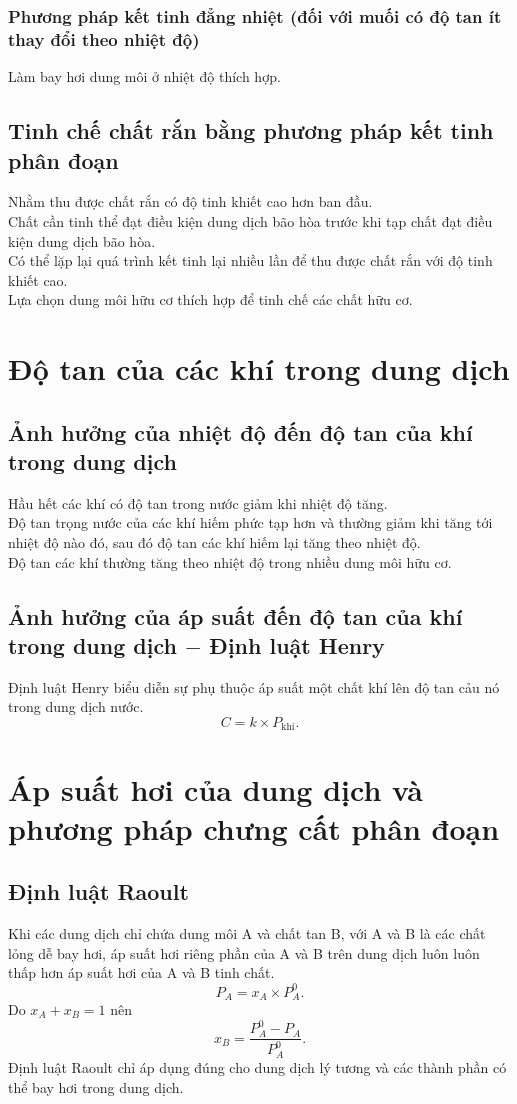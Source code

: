 \subsubsection{Phương pháp kết tinh đẳng nhiệt (đối với muối có độ tan ít thay đổi theo nhiệt độ)}
Làm bay hơi dung môi ở nhiệt độ thích hợp.
\subsection{Tinh chế chất rắn bằng phương pháp kết tinh phân đoạn}
Nhằm thu được chất rắn có độ tinh khiết cao hơn ban đầu.\\
Chất cần tinh thể đạt điều kiện dung dịch bão hòa trước khi tạp chất đạt điều kiện dung dịch bão hòa.\\
Có thể lặp lại quá trình kết tinh lại nhiều lần để thu được chất rắn với độ tinh khiết cao.\\
Lựa chọn dung môi hữu cơ thích hợp để tinh chế các chất hữu cơ.
\section{Độ tan của các khí trong dung dịch}
\subsection{Ảnh hưởng của nhiệt độ đến độ tan của khí trong dung dịch}
Hầu hết các khí có độ tan trong nước giảm khi nhiệt độ tăng.\\
Độ tan trọng nước của các khí hiếm phức tạp hơn và thường giảm khi tăng tới nhiệt độ nào đó, sau đó độ tan các khí hiếm lại tăng theo nhiệt độ.\\
Độ tan các khí thường tăng theo nhiệt độ trong nhiều dung môi hữu cơ.
\subsection{Ảnh hưởng của áp suất đến độ tan của khí trong dung dịch $-$ Định luật Henry}
Định luật Henry biểu diễn sự phụ thuộc áp suất một chất khí lên độ tan cảu nó trong dung dịch nước.
$$C = k \times P_{\text{khí}}.$$
\section{Áp suất hơi của dung dịch và phương pháp chưng cất phân đoạn}
\subsection{Định luật Raoult}
Khi các dung dịch chỉ chứa dung môi A và chất tan B, với A và B là các chất lỏng dễ bay hơi, áp suất hơi riêng phần của A và B trên dung dịch luôn luôn thấp hơn áp suất hơi của A và B tinh chất.
$$P_A = x_A \times P_A^0.$$
Do $x_A + x_B = 1$ nên
$$x_B = \frac{P_A^0 - P_A}{P_A^0}.$$
Định luật Raoult chỉ áp dụng đúng cho dung dịch lý tương và các thành phần có thể bay hơi trong dung dịch.
